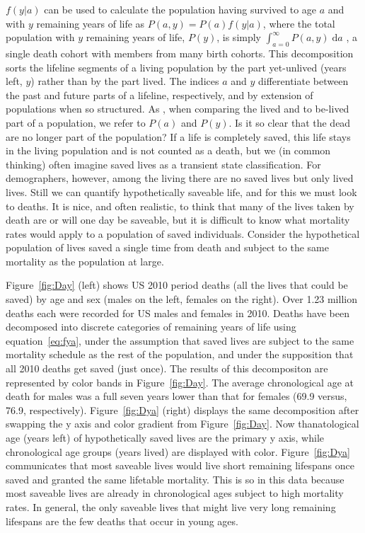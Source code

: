 \documentclass{article}
\newcommand{\dd}{\; \mathrm{d}}
\begin{document}
$f(y|a)$ can be used to calculate the population having survived to age $a$ and
with $y$ remaining years of life as $P(a,y) = P(a)f(y|a)$, where the total
population with $y$ remaining years of life, $P(y)$, is simply $\int
_{a=0}^\infty P(a,y) \dd a$ \citep{brouard1986structure, brouard1989mouvements},
a single death cohort with members from many birth cohorts. This decomposition sorts the lifeline segments of a living population
by the part yet-unlived (years left, $y$) rather than by the part lived. 
The indices $a$ and $y$ differentiate between the past and future
parts of a lifeline, respectively, and by extension of populations when
so structured. As \citet{brouard1986structure}, when comparing the lived and
to be-lived part of a population, we refer to $P(a)$ and $P(y)$.
Is it so clear that the dead are no longer part of the population? If a life is
completely saved, this life stays in the living population and is not counted
as a death, but we (in common thinking) often imagine saved lives as a transient
state classification.
For demographers, however, among the living there
are no saved lives but only lived lives. Still we can quantify
hypothetically saveable life, and for this we must look to deaths.
It is nice, and often realistic, to think that many of the lives taken by death
are or will one day be saveable, but it is difficult to know what mortality
rates would apply to a population of saved individuals. Consider
the hypothetical population of lives saved a single time from death and subject to
the same mortality as the population at large.

Figure~\ref{fig:Day} (left) shows US 2010 period
deaths (all the lives that could be saved) by age and sex (males on the left,
females on the right). Over 1.23 million deaths each were recorded for US males
and females in 2010. Deaths have been decomposed into discrete
categories of remaining years of life using equation~\eqref{eq:fya}, under the assumption that saved lives are subject to the same mortality schedule as the rest of the population, and under the supposition that all 2010 deaths get saved (just once). The results of this decompositon are represented by color bands in
Figure~\ref{fig:Day}. The average chronological age at death
for males was a full seven years lower than that for females
(69.9 versus, 76.9, respectively). Figure~\ref{fig:Dya} (right) displays the
same decomposition after swapping the y axis and color gradient from Figure~\ref{fig:Day}. Now thanatological age (years left) of hypothetically saved lives are the primary y axis, while chronological age groups (years lived) are displayed with color. Figure~\ref{fig:Dya} communicates that most saveable
lives would live short remaining lifespans once saved and granted the same lifetable
mortality. This is so in this data because most saveable lives are already in
chronological ages subject to high mortality rates. In general, the only
saveable lives that might live very long remaining lifespans are the few deaths that occur in young ages. 
\end{document}
